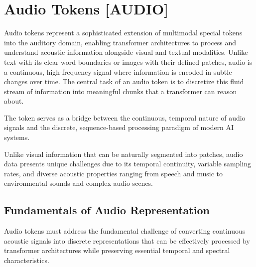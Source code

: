 
\section{Audio Tokens [AUDIO]}

Audio tokens represent a sophisticated extension of multimodal special tokens into the auditory domain, enabling transformer architectures to process and understand acoustic information alongside visual and textual modalities. Unlike text with its clear word boundaries or images with their defined patches, audio is a continuous, high-frequency signal where information is encoded in subtle changes over time. The central task of an audio token is to discretize this fluid stream of information into meaningful chunks that a transformer can reason about.

The  token serves as a bridge between the continuous, temporal nature of audio signals and the discrete, sequence-based processing paradigm of modern AI systems.

\begin{comment}
Feedback: This is a strong start. To immediately frame the core challenge, you could add: "Unlike text with its clear word boundaries or images with their defined patches, audio is a continuous, high-frequency signal where information is encoded in subtle changes over time. The central task of an audio token is to discretize this fluid stream of information into meaningful chunks that a transformer can reason about."

STATUS: addressed - added explanation of the core challenge of audio tokenization and its differences from text and images
\end{comment}

Unlike visual information that can be naturally segmented into patches, audio data presents unique challenges due to its temporal continuity, variable sampling rates, and diverse acoustic properties ranging from speech and music to environmental sounds and complex audio scenes.

\subsection{Fundamentals of Audio Representation}

Audio tokens must address the fundamental challenge of converting continuous acoustic signals into discrete representations that can be effectively processed by transformer architectures while preserving essential temporal and spectral characteristics.

